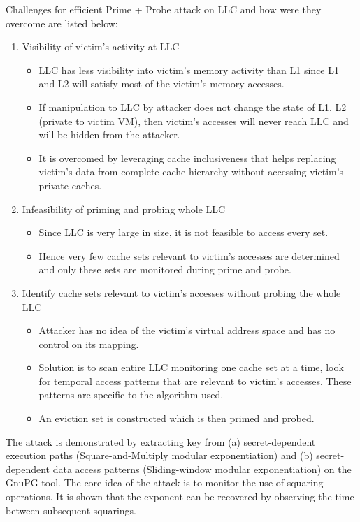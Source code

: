 \documentclass[a4paper,12pt, final]{report}
\begin{document}
Challenges for efficient Prime + Probe attack on LLC and how were they overcome are listed below:
\begin{enumerate}
    \item Visibility of victim's activity at LLC
    \begin{itemize}
        \item LLC has less visibility into victim's memory activity than L1 since L1 and L2 will satisfy most of the victim's memory accesses.
        \item If manipulation to LLC by attacker does not change the state of L1, L2 (private to victim VM), then victim's accesses will never reach LLC and will be hidden from the attacker.
        \item It is overcomed by leveraging cache inclusiveness that helps replacing victim's data from complete cache hierarchy without accessing victim's private caches.
    \end{itemize}
    
    \item Infeasibility of priming and probing whole LLC
    \begin{itemize}
        \item Since LLC is very large in size, it is not feasible to access every set.
        \item Hence very few cache sets relevant to victim's accesses are determined and only these sets are monitored during prime and probe.
    \end{itemize}
    
    \item Identify cache sets relevant to victim's accesses without probing the whole LLC
    \begin{itemize}
        \item Attacker has no idea of the victim's virtual address space and has no control on its mapping.
        \item Solution is to scan entire LLC monitoring one cache set at a time, look for temporal access patterns that are relevant to victim's accesses. These patterns are specific to the algorithm used.
        \item An eviction set is constructed which is then primed and probed.
    \end{itemize}
\end{enumerate}

The attack is demonstrated by extracting key from (a) secret-dependent execution paths (Square-and-Multiply modular exponentiation) and (b) secret-dependent data access patterns (Sliding-window modular exponentiation) on the GnuPG tool. The core idea of the attack is to monitor the use of squaring operations. It is shown that the exponent can be recovered by observing the time between subsequent squarings.
\end{document}

